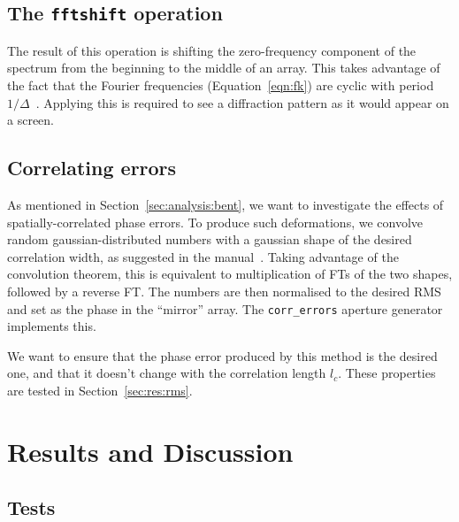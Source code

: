 \documentclass[11pt]{article}
\begin{document}
\subsection{The \texttt{fftshift} operation}
The result of this operation is shifting the zero-frequency component of the spectrum from the beginning to the middle of an array. This takes advantage of the fact that the Fourier frequencies (Equation~\ref{eqn:fk}) are cyclic with period $1/\Delta$~\cite[Section~12.1.2]{NumRecipes}. Applying this is required to see a diffraction pattern as it would appear on a screen.

\subsection{Correlating errors}
As mentioned in Section~\ref{sec:analysis:bent}, we want to investigate the effects of spatially-correlated phase errors. To produce such deformations, we convolve random gaussian-distributed numbers with a gaussian shape of the desired correlation width, as suggested in the manual~\cite{manual}. Taking advantage of the convolution theorem, this is equivalent to multiplication of FTs of the two shapes, followed by a reverse FT. The numbers are then normalised to the desired RMS and set as the phase in the ``mirror'' array. The \texttt{corr\_errors} aperture generator implements this.

We want to ensure that the phase error produced by this method is the desired one, and that it doesn't change with the correlation length $l_c$. These properties are tested in Section~\ref{sec:res:rms}.

\section{Results and Discussion}\label{sec:res}
\subsection{Tests}
\end{document}

